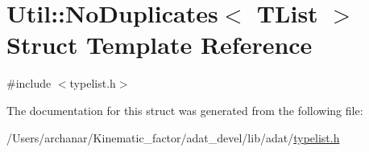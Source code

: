 \hypertarget{structUtil_1_1TL_1_1NoDuplicates}{}\section{Util\+:\+:No\+Duplicates$<$ T\+List $>$ Struct Template Reference}
\label{structUtil_1_1TL_1_1NoDuplicates}


{\ttfamily \#include $<$typelist.\+h$>$}



The documentation for this struct was generated from the following file\+:\begin{DoxyCompactItemize}
\item 
/\+Users/archanar/\+Kinematic\+\_\+factor/adat\+\_\+devel/lib/adat/\mbox{\hyperlink{lib_2adat_2typelist_8h}{typelist.\+h}}\end{DoxyCompactItemize}
